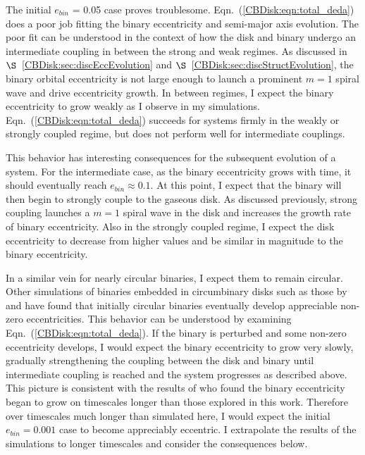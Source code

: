 The initial $e_{bin}$ = 0.05 case proves troublesome.  Eqn.~(\ref{CBDisk:eqn:total_deda}) does a poor job fitting the binary eccentricity and semi-major axis evolution.  The poor fit can be understood in the context of how the disk and binary undergo an intermediate coupling in between the strong and weak regimes.  As discussed in $\S$~\ref{CBDisk:sec:discEccEvolution} and $\S$~\ref{CBDisk:sec:discStructEvolution}, the binary orbital eccentricity is not large enough to launch a prominent $m = 1$ spiral wave and drive eccentricity growth.  In between regimes, I expect the binary eccentricity to grow weakly as I observe in my simulations.  Eqn.~(\ref{CBDisk:eqn:total_deda}) succeeds for systems firmly in the weakly or strongly coupled regime, but does not perform well for intermediate couplings.

This behavior has interesting consequences for the subsequent evolution of a system.  For the intermediate case, as the binary eccentricity grows with time, it should eventually reach $e_{bin} \approx 0.1$. At this point, I expect that the binary will then begin to strongly couple to the gaseous disk.  As discussed previously, strong coupling launches a $m = 1$ spiral wave in the disk and increases the growth rate of binary eccentricity.  Also in the strongly coupled regime, I expect the disk eccentricity to decrease from higher values and be similar in magnitude to the binary eccentricity.  

In a similar vein for nearly circular binaries, I expect them to remain circular.  Other simulations of binaries embedded in circumbinary disks such as those by \citet{Pierens2007} and \citet{Cuadra2009} have found that initially circular binaries eventually develop appreciable non-zero eccentricities.  This behavior can be understood by examining Eqn.~(\ref{CBDisk:eqn:total_deda}).  If the binary is perturbed and some non-zero eccentricity develops, I would expect the binary eccentricity to grow very slowly, gradually strengthening the coupling between the disk and binary until intermediate coupling is reached and the system progresses as described above.  This picture is consistent with the results of \citet{Pierens2007} who found the binary eccentricity began to grow on timescales longer than those explored in this work.  Therefore over timescales much longer than simulated here, I would expect the initial $e_{bin} = 0.001$ case to become appreciably eccentric.  I extrapolate the results of the simulations to longer timescales and consider the consequences below.

